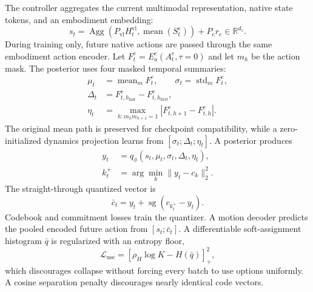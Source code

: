 The controller aggregates the current multimodal representation, native state
tokens, and an embodiment embedding:
\begin{equation}
    s_t=\operatorname{Agg}\!\left(
       P_{\mathrm{vl}}H_t^{\mathrm{vl}},
       \operatorname{mean}(S_t^e)\right)
       +P_e r_e \in\mathbb{R}^{d_z}.
    \label{eq:state-summary}
\end{equation}
During training only, future native actions are passed through the same
embodiment action encoder.  Let
\(F_t^e=E_a^e(A_t^e,\tau{=}0)\) and let \(m_h\) be the action mask.  The
posterior uses four masked temporal summaries:
\begin{equation}
\begin{aligned}
    \mu_t &= \operatorname{mean}_{m} F_t^e,\qquad
    \sigma_t = \operatorname{std}_{m} F_t^e,\\
    \Delta_t &= F_{t,h_{\mathrm{last}}}^e - F_{t,h_{\mathrm{first}}}^e,\\
    \eta_t &= \max_{h:m_hm_{h+1}=1}\left|F_{t,h+1}^e-F_{t,h}^e\right|.
\end{aligned}
\label{eq:temporal-summary}
\end{equation}
The original mean path is preserved for checkpoint compatibility, while a
zero-initialized dynamics projection learns from
\([\sigma_t;\Delta_t;\eta_t]\).  A posterior produces
\begin{equation}
    \begin{aligned}
    y_t&=q_\phi\!\left(s_t,
       \mu_t,\sigma_t,\Delta_t,\eta_t\right),\\
    k_t^+&=\arg\min_k\|y_t-c_k\|_2^2.
    \end{aligned}
    \label{eq:future-posterior}
\end{equation}
The straight-through quantized vector is
\begin{equation}
    \bar c_t=y_t+\operatorname{sg}(c_{k_t^+}-y_t).
    \label{eq:straight-through}
\end{equation}
Codebook and commitment losses train the quantizer.  A motion decoder predicts
the pooled encoded future action from \([s_t;\bar c_t]\).  A differentiable
soft-assignment histogram \(\bar q\) is regularized with an entropy floor,
\begin{equation}
    \mathcal{L}_{\mathrm{use}}
    =
    \left[\rho_H\log K-H(\bar q)\right]_+^2,
    \label{eq:usage-entropy-floor}
\end{equation}
which discourages collapse without forcing every batch to use options
uniformly.  A cosine separation penalty discourages nearly identical code
vectors.

